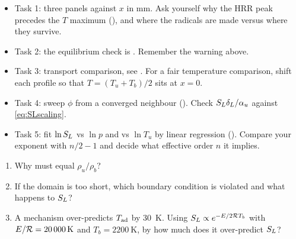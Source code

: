 \begin{project}[Part 3]
\begin{itemize}
  \item Task 1: three panels against $x$ in mm. Ask yourself why the HRR peak precedes the $T$ maximum
        (), and where the radicals are made versus where they survive.
  \item Task 2: the equilibrium check is . Remember the warning above.
  \item Task 3: transport comparison, see . For a fair temperature comparison, shift each
        profile so that $T=(T_u+T_b)/2$ sits at $x=0$.
  \item Task 4: sweep $\phi$ from a converged neighbour (). Check $S_L\delta_L/\alpha_u$
        against \eqref{eq:SLscaling}.
  \item Task 5: fit $\ln S_L$ vs $\ln p$ and vs $\ln T_u$ by linear regression (). Compare your
        exponent with $n/2-1$ and decide what effective order $n$ it implies.
\end{itemize}
\end{project}

\begin{selfcheck}
\begin{enumerate}
  \item Why must  equal $\rho_u/\rho_b$?
  \item If the domain is too short, which boundary condition is violated and what happens to $S_L$?
  \item A mechanism over-predicts $T_{\mathrm{ad}}$ by \SI{30}{\kelvin}. Using $S_L\propto e^{-E/2\mathcal{R} T_b}$ with
        $E/\mathcal{R}=\SI{20000}{\kelvin}$ and $T_b=\SI{2200}{\kelvin}$, by how much does it over-predict $S_L$?
\end{enumerate}
\end{selfcheck}
